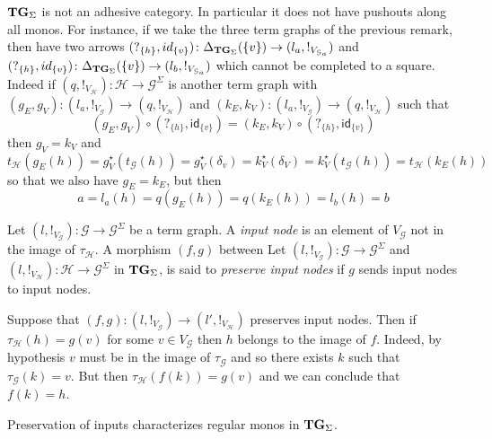 \documentclass[a4paper,UKenglish,cleveref,pdftex,thm-restate,numberwithinsect]{lipics-v2021}
\newcommand{\catname}[1]{\textbf{\textup{#1}}}
\newcommand{\tg}[0]{\catname{TG}_{\Sigma}}
\newcommand{\id}[1]{\mathsf{id}_{#1}}
\begin{document}
{\begin{remark}
	$\tg$ is not an adhesive category. In particular it does not have pushouts along all monos. For instance, if we take the three term graphs of the previous remark, then have two arrows
	$(?_{\{h\}}, \id{\{v\}})\colon \Delta_{\tg}(\{v\})\to (l_a, !_{V_{\mathcal{G}_a}})$ and $(?_{\{h\}}, \id{\{v\}})\colon \Delta_{\tg}(\{v\})\to (l_b, !_{V_{\mathcal{G}_a}})$ which cannot be completed to a square. Indeed if $(q, !_{V_\mathcal{H}})\colon \mathcal{H}\to \mathcal{G}^\Sigma$ is another term graph with $(g_E, g_V)\colon (l_a, !_{V_{\mathcal{G}}})\to (q, !_{V_\mathcal{H}})$ and $(k_E, k_V)\colon (l_a, !_{V_{\mathcal{G}}})\to (q, !_{V_\mathcal{H}})$  such that 
	\[(g_E, g_V)\circ (?_{\{h\}}, \id{\{v\}}) = (k_E, k_V)\circ (?_{\{h\}}, \id{\{v\}})\]
	then $g_V=k_V$ and
	\[t_{\mathcal{H}}(g_E(h))=g^\star_V(t_{\mathcal{G}}(h))=g_V^\star(\delta_v)=k^\star_V(\delta_V)=k^\star_V(t_{\mathcal{G}}(h))=t_{\mathcal{H}}(k_E(h))\]
	so that we also have $g_E=k_E$, but then
	\[
	a=l_a(h)=q(g_E(h))=q(k_E(h))=l_b(h)=b\]
\end{remark}
}

\begin{definition}
	Let $(l, !_{V_{\mathcal{G}}})\colon \mathcal{G}\to \mathcal{G}^{\Sigma}$  be a term graph. A \emph{input node} is an element of $V_{\mathcal{G}}$ not in the image of $\tau_{\mathcal{H}}$.  A morphism $(f,g)$ between
	Let $(l, !_{V_{\mathcal{G}}})\colon \mathcal{G}\to \mathcal{G}^{\Sigma}$ and $(l, !_{V_{\mathcal{H}}})\colon \mathcal{H}\to \mathcal{G}^{\Sigma}$ in $\tg$, is said to \emph{preserve input nodes} if $g$ sends input nodes to input nodes.
\end{definition}

\begin{remark}\label{prop:image}
	Suppose that $(f,g)\colon (l, !_{V_{\mathcal{G}}})\to (l', !_{V_{\mathcal{H}}})$ preserves input nodes. Then  if $\tau_{\mathcal{H}}(h)=g(v)$ for some $v\in V_{\mathcal{G}}$ then $h$ belongs to the image of $f$. Indeed, by hypothesis $v$ must be in the image of $\tau_{\mathcal{G}}$ and so there exists $k$ such that $\tau_{\mathcal{G}}(k)=v$. But then $\tau_{\mathcal{H}}(f(k))=g(v)$ and we can conclude that $f(k)=h$.
\end{remark}

Preservation of inputs characterizes regular monos in $\tg$.

\end{document}
